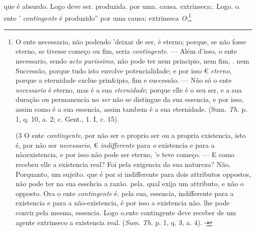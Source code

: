 que é absurdo. Logo deve ser. produzida. por uma. causa. extrinseca:. Logo. o. ente ' \emph{contingente} é produzido” por uma causa: extrinseca \emph{O}:\footnote{O ente necessario, não podendo 'deixar de ser, é eterno; porque, se não fosse eterno, se tivesse começo ou fim, seria \emph{contingente}. --- Além d'isso, o ente necessario, sendo \emph{acto purissimo}, não pode ter nem principio, nem fim, . nem Successão, porque tudo isto envolve potencialidade; e por isso € \emph{eterno}, porque a eternidade exclue prin\&ipio, fim e successão. --- Não só o ente \emph{necessario} é eterno, mas é a sua \emph{eternidade}; porque elle é o seu ser, e a sua duração ou permanencia no \emph{ser} não se distingue da sua essencia, e por isso, assim como é a sua essencia, assim tambem é a sua eternidade. (Sum. \emph{Th}. p. 1, q. 10, a. 2; c. Gent., 1. I, c. 15).\par (3 O ente \emph{contingente}, por não ser o proprio ser ou a propria existencia, isto é, por não ser \emph{necessario}, € \emph{indifferente} para \emph{o} existencia e para a nàoexistencia, e por isso não pode ser eterno, 'e teve começo. --- E como recebeu elle a existencia real? Foi pela exigencia da sua natureza? Não. Porquanto, um sujeito. que é por si indifferente para dois attributos oppostos, não pode ter na sua essehcia a razão. pela. qual exija um attributo, e não o opposto. Ora o ente \emph{contingente} é. pela sua, essencia, indifferente para a existencia e para a não-existencia, é por isso a existencia não. lhe pode convir.pela mesma, essencia. Logo o.ente contingente deve receber de um agente extrinseco a existencia real. (\emph{Sum}. \emph{Th}. p. 1, q. 3, a. 4). -}

